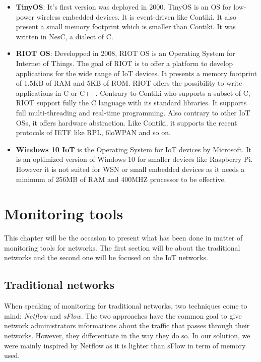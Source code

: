 \begin{itemize}
\item \textbf{TinyOS}: It's first version was deployed in 2000. TinyOS \cite{website:tinyos} is an OS for low-power wireless embedded devices. It is event-driven like Contiki. It also present a small memory footprint which is smaller than Contiki. It was written in NesC, a dialect of C.
\item \textbf{RIOT OS}: Developped in 2008, RIOT OS \cite{website:riot} \cite{baccelli2013riot} is an Operating System for Internet of Things. The goal of RIOT is to offer a platform to develop applications for the wide range of IoT devices. It presents a memory footprint of 1.5KB of RAM and 5KB of ROM. RIOT offers the possibility to write applications in C or C++. Contrary to Contiki who supports a subset of C, RIOT support fully the C language with its standard libraries. It supports full multi-threading and real-time programming. Also contrary to other IoT OSs, it offers hardware abstraction. Like Contiki, it supports the recent protocols of IETF like RPL, 6loWPAN and so on.
\item \textbf{Windows 10 IoT} \cite{website:win10} is the Operating System for IoT devices by Microsoft. It is an optimized version of Windows 10 for smaller devices like Raspberry Pi. However it is not suited for WSN or small embedded devices as it needs a minimum of 256MB of RAM and 400MHZ processor to be effective.
\end{itemize}

\chapter{Monitoring tools}

This chapter will be the occasion to present what has been done in matter of monitoring tools for networks. The first section will be about the traditional networks and the second one will be focused on the IoT networks.

\section{Traditional networks}

When speaking of monitoring for traditional networks, two techniques come to mind: \textit{Netflow} and \textit{sFlow}. The two approaches have the common goal to give network administrators informations about the traffic that passes through their networks. However, they differentiate in the way they do so. In our solution, we were mainly inspired by Netflow as it is lighter than sFlow in term of memory used.

